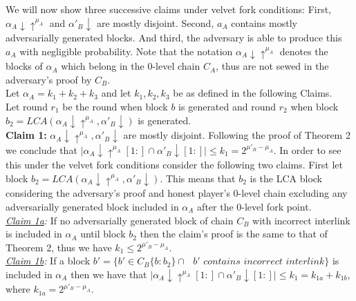 \documentclass[11pt,a4paper]{article}
\begin{document}
We will now show three successive claims under velvet fork conditions: First, $\alpha_A \downarrow \uparrow^{\mu_A}$ and $\alpha'_B \downarrow$ are mostly disjoint. Second, $a_A$ contains mostly adversarially generated blocks. And third, the adversary is able to produce this $a_A$ with negligible probability. Note that the notation $\alpha_A \downarrow \uparrow^{\mu_A}$ denotes the blocks of $\alpha_A$ which belong in the 0-level chain $C_A$, thus are not sewed in the adversary's proof by $C_B$.\\
Let $\alpha_A = k_1 + k_2 + k_3$ and let $k_1, k_2, k_3$ be as defined in the following Claims.\\
Let round $r_1$ be the round when block $b$ is generated and round $r_2$ when block $b_2 = LCA(\alpha_A \downarrow \uparrow^{\mu_A}, \alpha'_B\downarrow)$ is generated.\\
\textbf{Claim 1:} $\alpha_A \downarrow \uparrow^{\mu_A}, \alpha'_B\downarrow$ are mostly disjoint. Following the proof of Theorem 2 we conclude that $\vert \alpha_A\downarrow\uparrow^{\mu_A}[1:] \cap \alpha'_B\downarrow[1:] \vert \leq k_{1} = 2^{\mu'_B - \mu_A}$. In order to see this under the velvet fork conditions consider the following two claims. First let block $b_2 = LCA(\alpha_A \downarrow \uparrow^{\mu_A}, \alpha'_B\downarrow)$. This means that $b_2$ is the LCA block considering the adversary's proof and honest player's 0-level chain excluding any adversarially generated block included in $\alpha_A$ after the 0-level fork point.\\
\textit{\underline{Claim 1a}:} If no adversarially generated block of chain $C_B$ with incorrect interlink is included in $\alpha_A$ until block $b_2$ then the claim's proof is the same to that of Theorem 2, thus we have $k_1 \leq 2^{\mu'_B - \mu_A}$.\\
\textit{\underline{Claim 1b}:}  If a block $b' = \{b' \in C_B\{b:b_2\} \cap \textit{ } b' \textit{ contains incorrect interlink} \}$ is included in $\alpha_A$ then we have that $\vert \alpha_A\downarrow\uparrow^{\mu_A}[1:] \cap \alpha'_B\downarrow[1:] \vert \leq k_1 = k_{1a} + k_{1b}$, where $ k_{1a} = 2^{\mu'_B - \mu_A}$. 
	
\end{document}
